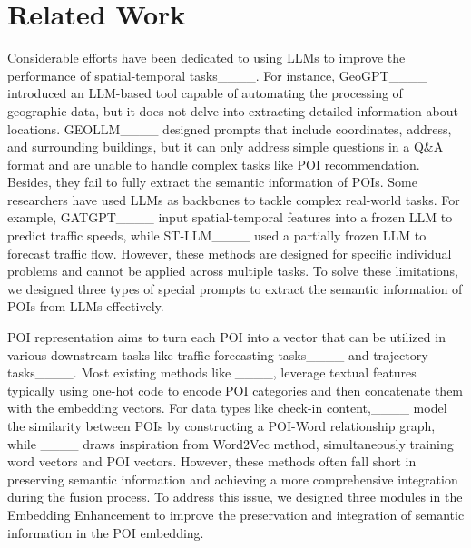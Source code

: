 \section{Related Work}
\label{sec:related}
Considerable efforts have been dedicated to using LLMs to improve the performance of spatial-temporal tasks____. For instance, GeoGPT____ introduced an LLM-based tool capable of automating the processing of geographic data, but it does not delve into extracting detailed information about locations. GEOLLM____ designed prompts that include coordinates, address, and surrounding buildings, but it can only address simple questions in a Q\&A format and are unable to handle complex tasks like POI recommendation. Besides, they fail to fully extract the semantic information of POIs.
Some researchers have used LLMs as backbones to tackle complex real-world tasks. For example, GATGPT____ input spatial-temporal features into a frozen LLM to predict traffic speeds, while ST-LLM____ used a partially frozen LLM to forecast traffic flow. However, these methods are designed for specific individual problems and cannot be applied across multiple tasks.
To solve these limitations, we designed three types of special prompts to extract the semantic information of POIs from LLMs effectively.

POI representation aims to turn each POI into a vector that can be utilized in various downstream tasks like traffic forecasting tasks____ and trajectory tasks____. Most existing methods like ____, leverage textual features typically using one-hot code to encode POI categories and then concatenate them with the embedding vectors. For data types like check-in content,____ model the similarity between POIs by constructing a POI-Word relationship graph, while ____ draws inspiration from Word2Vec method, simultaneously training word vectors and POI vectors. However, these methods often fall short in preserving semantic information and achieving a more comprehensive integration during the fusion process.
To address this issue, we designed three modules in the Embedding Enhancement to improve the preservation and integration of semantic information in the POI embedding.


